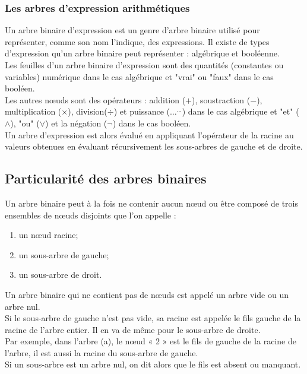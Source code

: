 \documentclass{report}
\begin{document}
\subsubsection{Les arbres d'expression arithmétiques}

Un arbre binaire d'expression est un genre d'arbre binaire utilisé pour représenter, comme son nom l'indique, des expressions. Il existe de types d'expression qu'un arbre binaire peut représenter : algébrique et booléenne.  \\ 
Les feuilles d'un arbre binaire d'expression sont des quantités (constantes ou variables) numérique dans le cas algébrique et "vrai" ou "faux" dans le cas booléen.\\
Les autres nœuds sont des opérateurs : addition ($+$), soustraction ($-$), multiplication ($\times$), division($\div$) et puissance ($\ldots^{\ldots}$) dans le cas algébrique et "et" ($\wedge$), "ou" ($\vee$) et la négation ($\neg$) dans le cas booléen.\\
Un arbre d'expression est alors évalué en appliquant l'opérateur de la racine au valeurs obtenues en évaluant récursivement les sous-arbres de gauche et de droite.

\begin{center}
\end{center}


  
\subsection{Particularité des arbres binaires}

Un arbre binaire peut à la fois ne contenir aucun nœud ou être composé de trois ensembles de nœuds disjoints que l'on appelle :
\begin{enumerate}
\item un nœud racine;
\item un sous-arbre de gauche;
\item un sous-arbre de droit.
\end{enumerate}

Un arbre binaire qui ne contient pas de nœuds est appelé un arbre vide ou un arbre nul.\\
Si le sous-arbre de gauche n'est pas vide, sa racine est appelée le fils gauche de la racine de l'arbre entier. Il en va de même pour le sous-arbre de droite.\\
Par exemple, dans l'arbre (a), le nœud « 2 » est le fils de gauche de la racine de l'arbre, il est aussi la racine du sous-arbre de gauche.\\
Si un sous-arbre est un arbre nul, on dit alors que le fils est absent ou manquant.\\
\end{document}
